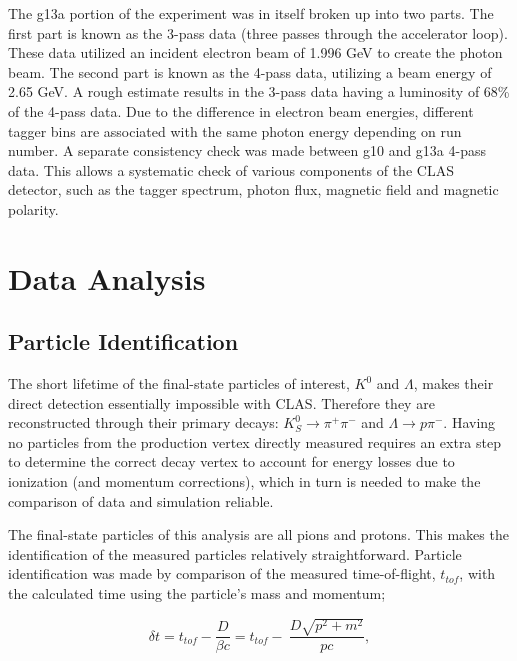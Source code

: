\documentclass[prb,10pt,twocolumn,tightenlines,superscriptaddress]{revtex4-1}
\begin{document}
The g13a portion of the experiment was in itself broken up into two parts.
The first part is known as the 3-pass data (three passes through the accelerator loop). These data utilized an incident electron beam of 1.996 GeV to create the photon beam. The second part is known as the 4-pass data, utilizing a beam energy of 2.65 GeV. A rough estimate results in the 3-pass data having a luminosity of 68\% of the 4-pass data. Due to the difference in electron beam energies, different tagger bins are associated with the same photon energy depending on run number. A separate consistency check was made between g10 and g13a 4-pass data. This allows a systematic check of various components of the CLAS detector, such as the tagger spectrum, photon flux, magnetic field and magnetic polarity.


\section{Data Analysis}

\subsection{Particle Identification}
The short lifetime of the final-state particles of interest, $K^{0}$ and $\Lambda$, makes their direct detection essentially impossible with CLAS.
Therefore they are reconstructed through their primary decays: $K^{0}_{S}\rightarrow \pi^{+}\pi^{-}$ and $\Lambda\rightarrow p\pi^{-}$.
Having no particles from the production vertex directly measured requires an extra step to determine the correct decay vertex to account for energy losses due to ionization (and momentum corrections), which in turn is needed to make the comparison of data and simulation reliable.

The final-state particles of this analysis are all pions and protons.
This makes the identification of the measured particles relatively straightforward.  
Particle identification was made by comparison of the measured time-of-flight, $t_{tof}$, with the calculated time using the particle's mass and momentum; 

\vspace{5mm} %
\begin{equation} 
\delta t=t_{tof}-\frac{D}{\beta c}=t_{tof}-\ \frac{D\sqrt{p^2+m^2}}{pc}, \label{EQ1}               
\end{equation} 
\vspace{5mm} %
\end{document}
